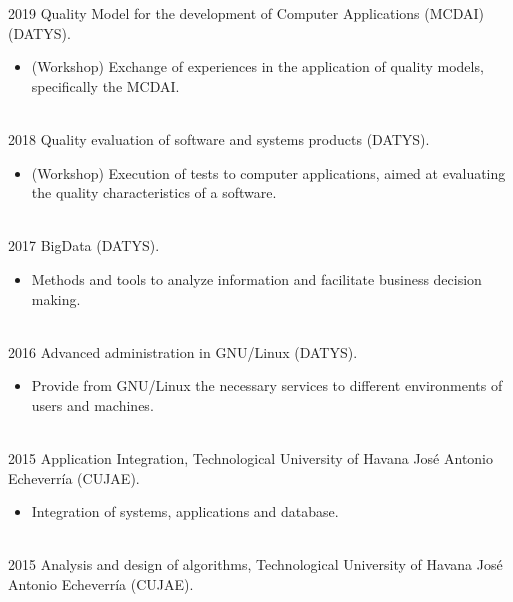 \documentclass[letterpaper]{twentysecondcv} %
\begin{document}
\begin{twenty} %
\twentyitem
    	{2019}
		{}
        {Quality Model for the development of Computer Applications (MCDAI) (DATYS).}
        {}
        {}
        {
        {\begin{itemize}
        \item (Workshop) Exchange of experiences in the application of quality models, specifically the MCDAI.
		\end{itemize}}
        }
        \\
\twentyitem
    	{2018}
		{}
        {Quality evaluation of software and systems products (DATYS).}
        {}
        {}
        {
        {\begin{itemize}
        \item (Workshop) Execution of tests to computer applications, aimed at evaluating the quality characteristics of a software.
		\end{itemize}}
        }
        \\
\twentyitem
    	{2017}
		{}
        {BigData (DATYS).}
        {}
        {}
        {
        {\begin{itemize}
        \item Methods and tools to analyze information and facilitate business decision making.
		\end{itemize}}
        }
        \\
\twentyitem
    	{2016}
		{}
        {Advanced administration in GNU/Linux (DATYS).}
        {}
        {}
        {
        {\begin{itemize}
        \item Provide from GNU/Linux the necessary services to different environments of users and machines.
		\end{itemize}}
        }
        \\
\twentyitem
    	{2015}
		{}
        {Application Integration, Technological University of Havana José Antonio
Echeverría (CUJAE).}
        {}
        {}
        {
        {\begin{itemize}
        \item Integration of systems, applications and database.
		\end{itemize}}
        }
        \\
\twentyitem
    	{2015}
		{}
        {Analysis and design of algorithms, Technological University of Havana José Antonio
Echeverría (CUJAE).}
        {}
        {}
        {
        {\begin{itemize}

\end{itemize}}}
\end{twenty}
\end{document}
